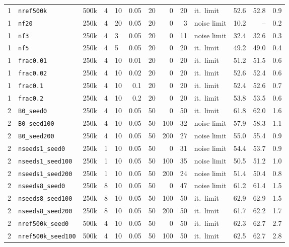 \documentclass[10pt]{article}
\begin{document}
{\begin{longtable}{rllllrrrrlrrr}
1 & \texttt{nref500k} & 500k & 4 & 10 & 0.05 & 20 & 0 & 20 & it.\ limit & 52.6 & 52.8 & 0.9 \\
1 & \texttt{nf20} & 250k & 4 & 20 & 0.05 & 20 & 0 & 3 & noise limit & 10.2 & -- & 0.2 \\
1 & \texttt{nf3} & 250k & 4 & 3 & 0.05 & 20 & 0 & 11 & noise limit & 32.4 & 32.6 & 0.3 \\
1 & \texttt{nf5} & 250k & 4 & 5 & 0.05 & 20 & 0 & 20 & it.\ limit & 49.2 & 49.0 & 0.4 \\
1 & \texttt{frac0.01} & 250k & 4 & 10 & 0.01 & 20 & 0 & 20 & it.\ limit & 51.2 & 51.5 & 0.6 \\
1 & \texttt{frac0.02} & 250k & 4 & 10 & 0.02 & 20 & 0 & 20 & it.\ limit & 52.6 & 52.4 & 0.6 \\
1 & \texttt{frac0.1} & 250k & 4 & 10 & 0.1 & 20 & 0 & 20 & it.\ limit & 52.4 & 52.6 & 0.7 \\
1 & \texttt{frac0.2} & 250k & 4 & 10 & 0.2 & 20 & 0 & 20 & it.\ limit & 53.8 & 53.5 & 0.6 \\
2 & \texttt{B0\_seed0} & 250k & 4 & 10 & 0.05 & 50 & 0 & 50 & it.\ limit & 61.8 & 62.0 & 1.6 \\
2 & \texttt{B0\_seed100} & 250k & 4 & 10 & 0.05 & 50 & 100 & 32 & noise limit & 57.9 & 58.3 & 1.1 \\
2 & \texttt{B0\_seed200} & 250k & 4 & 10 & 0.05 & 50 & 200 & 27 & noise limit & 55.0 & 55.4 & 0.9 \\
2 & \texttt{nseeds1\_seed0} & 250k & 1 & 10 & 0.05 & 50 & 0 & 31 & noise limit & 54.4 & 53.7 & 0.9 \\
2 & \texttt{nseeds1\_seed100} & 250k & 1 & 10 & 0.05 & 50 & 100 & 35 & noise limit & 50.5 & 51.2 & 1.0 \\
2 & \texttt{nseeds1\_seed200} & 250k & 1 & 10 & 0.05 & 50 & 200 & 24 & noise limit & 51.4 & 50.4 & 0.8 \\
2 & \texttt{nseeds8\_seed0} & 250k & 8 & 10 & 0.05 & 50 & 0 & 47 & noise limit & 61.2 & 61.4 & 1.5 \\
2 & \texttt{nseeds8\_seed100} & 250k & 8 & 10 & 0.05 & 50 & 100 & 50 & it.\ limit & 62.9 & 62.9 & 1.5 \\
2 & \texttt{nseeds8\_seed200} & 250k & 8 & 10 & 0.05 & 50 & 200 & 50 & it.\ limit & 61.7 & 62.2 & 1.7 \\
2 & \texttt{nref500k\_seed0} & 500k & 4 & 10 & 0.05 & 50 & 0 & 50 & it.\ limit & 62.3 & 62.7 & 2.7 \\
2 & \texttt{nref500k\_seed100} & 500k & 4 & 10 & 0.05 & 50 & 100 & 50 & it.\ limit & 62.5 & 62.7 & 2.8 \\

\end{longtable}}
\end{document}
